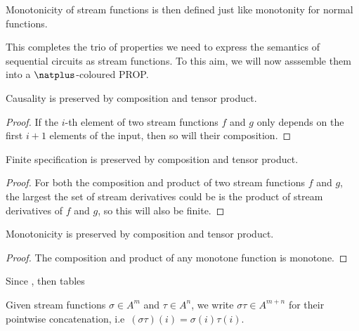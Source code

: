 Monotonicity of stream functions is then defined just like monotonity for normal
functions.

This completes the trio of properties we need to express the semantics of
sequential circuits as stream functions.
To this aim, we will now asssemble them into a \(\natplus\)-coloured PROP.

\begin{lemma}\label{lem:causality-preserved}
    Causality is preserved by composition and tensor product.
\end{lemma}
\begin{proof}
    If the \(i\)-th element of two stream functions \(f\) and \(g\) only depends
    on the first \(i+1\) elements of the input, then so will their composition.
\end{proof}

\begin{lemma}\label{lem:finitely-specified-preserved}
    Finite specification is preserved by composition and tensor product.
\end{lemma}
\begin{proof}
    For both the composition and product of two stream functions \(f\) and
    \(g\), the largest the set of stream derivatives could be is the product of
    stream derivatives of \(f\) and \(g\), so this will also be finite.
\end{proof}

\begin{lemma}\label{lem:monotonicity-preserved}
    Monotonicity is preserved by composition and tensor product.
\end{lemma}
\begin{proof}
    The composition and product of any monotone function is monotone.
\end{proof}

Since , then tables

\begin{notation}
    Given stream functions \(\sigma \in A^m\) and \(\tau \in A^n\), we write
    \(\sigma\tau \in A^{m+n}\) for their pointwise concatenation, i.e\
    \((\sigma\tau)(i) = \sigma(i)\tau(i)\).
\end{notation}

